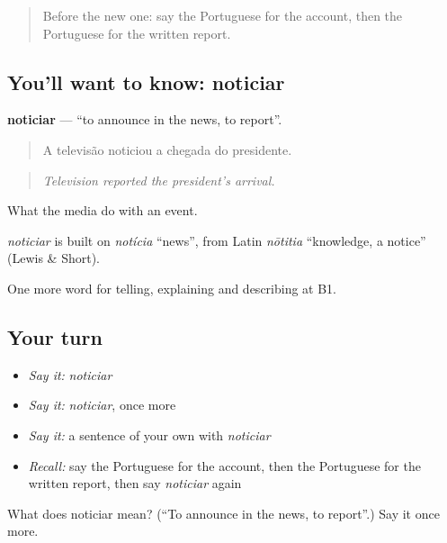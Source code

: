 \label{lesson:PT-C281-noticiar}



\begin{quote}
Before the new one: say the Portuguese for the account, then the Portuguese for the written report.
\end{quote}

\subsection*{You'll want to know: noticiar}
\textbf{noticiar} — \textquotedblleft{}to announce in the news, to report\textquotedblright{}.

\begin{quote}
A televisão noticiou a chegada do presidente.
\end{quote}

\begin{quote}
\emph{Television reported the president’s arrival.}
\end{quote}

What the media do with an event.

\begin{cousinweb}
\emph{noticiar} is built on \emph{notícia} \textquotedblleft{}news\textquotedblright{}, from Latin \emph{nōtitia} \textquotedblleft{}knowledge, a notice\textquotedblright{} (Lewis \& Short).
\end{cousinweb}

\begin{grammarlens}[title={What you've built}]
One more word for telling, explaining and describing at B1.
\end{grammarlens}

\subsection*{Your turn}
\begin{itemize}
\raggedright
  \item \emph{Say it:} \emph{noticiar}
  \item \emph{Say it:} \emph{noticiar}, once more
  \item \emph{Say it:} a sentence of your own with \emph{noticiar}
  \item \emph{Recall:} say the Portuguese for the account, then the Portuguese for the written report, then say \emph{noticiar} again
\end{itemize}

\begin{tcolorbox}[breakable,colback=teal!4,colframe=teal!35!black,title={Before you move on}]
What does noticiar mean? (\textquotedblleft{}To announce in the news, to report\textquotedblright{}.) Say it once more.
\end{tcolorbox}
